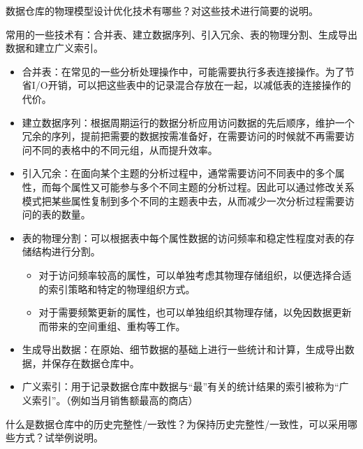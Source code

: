 \begin{problem}
数据仓库的物理模型设计优化技术有哪些？对这些技术进行简要的说明。
\end{problem}

\begin{solution}
常用的一些技术有：合并表、建立数据序列、引入冗余、表的物理分割、生成导出数据和建立广义索引。
\begin{itemize}
    \item 合并表：在常见的一些分析处理操作中，可能需要执行多表连接操作。为了节省I/O开销，可以把这些表中的记录混合存放在一起，以减低表的连接操作的代价。
    \item 建立数据序列：根据周期运行的数据分析应用访问数据的先后顺序，维护一个冗余的序列，提前把需要的数据按需准备好，在需要访问的时候就不再需要访问不同的表格中的不同元组，从而提升效率。
    \item 引入冗余：在面向某个主题的分析过程中，通常需要访问不同表中的多个属性，而每个属性又可能参与多个不同主题的分析过程。因此可以通过修改关系模式把某些属性复制到多个不同的主题表中去，从而减少一次分析过程需要访问的表的数量。
    \item 表的物理分割：可以根据表中每个属性数据的访问频率和稳定性程度对表的存储结构进行分割。
    \begin{itemize}
        \item 对于访问频率较高的属性，可以单独考虑其物理存储组织，以便选择合适的索引策略和特定的物理组织方式。
        \item 对于需要频繁更新的属性，也可以单独组织其物理存储，以免因数据更新而带来的空间重组、重构等工作。
    \end{itemize}
    \item 生成导出数据：在原始、细节数据的基础上进行一些统计和计算，生成导出数据，并保存在数据仓库中。
    \item 广义索引：用于记录数据仓库中数据与“最”有关的统计结果的索引被称为“广义索引”。（例如当月销售额最高的商店）
\end{itemize}
\end{solution}


\begin{problem}
什么是数据仓库中的历史完整性/一致性？为保持历史完整性/一致性，可以采用哪些方式？试举例说明。
\end{problem}


